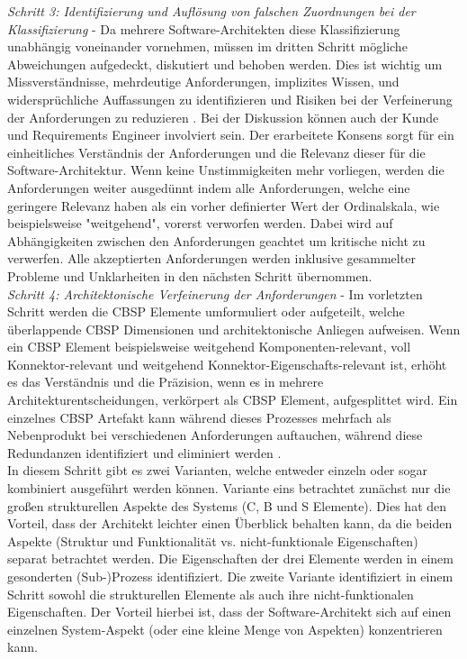 \emph{Schritt 3: Identifizierung und Aufl\"osung von falschen Zuordnungen bei der Klassifizierung} - 
Da mehrere Software-Architekten diese Klassifizierung unabh\"angig voneinander vornehmen, m\"ussen im dritten Schritt m\"ogliche Abweichungen aufgedeckt, diskutiert und behoben werden. Dies ist wichtig um Missverst\"andnisse, mehrdeutige Anforderungen, implizites Wissen, und widerspr\"uchliche Auffassungen zu identifizieren und Risiken bei der Verfeinerung der Anforderungen zu reduzieren \cite{Gru01}. Bei der Diskussion k\"onnen auch der Kunde und Requirements Engineer involviert sein. Der erarbeitete Konsens sorgt f\"ur ein einheitliches Verst\"andnis der Anforderungen und die Relevanz dieser f\"ur die Software-Architektur. Wenn keine Unstimmigkeiten mehr vorliegen, werden die Anforderungen weiter ausged\"unnt indem alle Anforderungen, welche eine geringere Relevanz haben als ein vorher definierter Wert der Ordinalskala, wie beispielsweise "weitgehend", vorerst verworfen werden. Dabei wird auf Abh\"angigkeiten zwischen den Anforderungen geachtet um kritische nicht zu verwerfen. Alle akzeptierten Anforderungen werden inklusive gesammelter Probleme und Unklarheiten in den n\"achsten Schritt \"ubernommen. \\

\emph{Schritt 4: Architektonische Verfeinerung der Anforderungen} - 
Im vorletzten Schritt werden die CBSP Elemente umformuliert oder aufgeteilt, welche \"uberlappende CBSP Dimensionen und architektonische Anliegen aufweisen. Wenn ein CBSP Element beispielsweise weitgehend Komponenten-relevant, voll Konnektor-relevant und weitgehend Konnektor-Eigenschafts-relevant ist, erh\"oht es das Verst\"andnis und die Pr\"azision, wenn es in mehrere Architekturentscheidungen, verk\"orpert als CBSP Element, aufgesplittet wird. Ein einzelnes CBSP Artefakt kann w\"ahrend dieses Prozesses mehrfach als Nebenprodukt bei verschiedenen Anforderungen auftauchen, w\"ahrend diese Redundanzen identifiziert und eliminiert werden \cite{Gru01}. \\

In diesem Schritt gibt es zwei Varianten, welche entweder einzeln oder sogar kombiniert ausgef\"uhrt werden k\"onnen. Variante eins betrachtet zun\"achst nur die gro\ss{}en strukturellen Aspekte des Systems (C, B und S Elemente). Dies hat den Vorteil, dass der Architekt leichter einen Überblick behalten kann, da die beiden Aspekte (Struktur und Funktionalit\"at vs. nicht-funktionale Eigenschaften) separat betrachtet werden. Die Eigenschaften der drei Elemente werden in einem gesonderten (Sub-)Prozess identifiziert. Die zweite Variante identifiziert in einem Schritt sowohl die strukturellen Elemente als auch ihre nicht-funktionalen Eigenschaften. Der Vorteil hierbei ist, dass der Software-Architekt sich auf einen einzelnen System-Aspekt (oder eine kleine Menge von Aspekten) konzentrieren kann. \\

